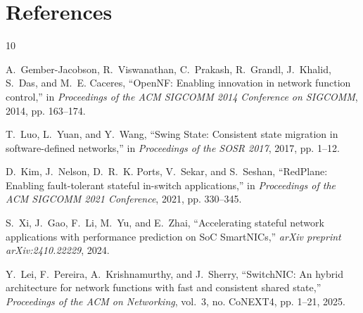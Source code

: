 \documentclass[10pt, conference]{IEEEtran}
\begin{document}
\section{References}
\label{sec:references}
\begin{thebibliography}{10}

A.~Gember-Jacobson, R.~Viswanathan, C.~Prakash, R.~Grandl, J.~Khalid, S.~Das,
and M.~E. Caceres, ``OpenNF: Enabling innovation in network function control,''
in \emph{Proceedings of the ACM SIGCOMM 2014 Conference on SIGCOMM}, 2014,
pp. 163--174.

T.~Luo, L.~Yuan, and Y.~Wang, ``Swing State: Consistent state migration in
software-defined networks,'' in \emph{Proceedings of the SOSR 2017}, 2017,
pp. 1--12.

D.~Kim, J.~Nelson, D.~R.~K. Ports, V.~Sekar, and S.~Seshan, ``RedPlane:
Enabling fault-tolerant stateful in-switch applications,'' in
\emph{Proceedings of the ACM SIGCOMM 2021 Conference}, 2021, pp. 330--345.

S.~Xi, J.~Gao, F.~Li, M.~Yu, and E.~Zhai, ``Accelerating stateful network
applications with performance prediction on SoC SmartNICs,''
\emph{arXiv preprint arXiv:2410.22229}, 2024.

Y.~Lei, F.~Pereira, A.~Krishnamurthy, and J.~Sherry, ``SwitchNIC: An hybrid
architecture for network functions with fast and consistent shared state,''
\emph{Proceedings of the ACM on Networking}, vol.~3, no. CoNEXT4, pp. 1--21,
2025.

\end{thebibliography}
\end{document}

